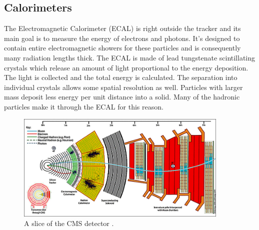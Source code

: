 \FloatBarrier
\subsection{Calorimeters}
The Electromagnetic Calorimeter (ECAL) is right outside the tracker and its main goal is to measure the energy of electrons and photons. It's designed to contain entire electromagnetic showers for these particles and is consequently many radiation lengths thick. The ECAL is made of lead tungstenate scintillating crystals which release an amount of light proportional to the energy deposition. The light is collected and the total energy is calculated. The separation into individual crystals allows some spatial resolution as well. Particles with larger mass deposit less energy per unit distance into a solid. Many of the hadronic particles make it through the ECAL for this reason.

\begin{figure}[h!]
  \centering
  \includegraphics[width=4in]{images/cms_slice.jpg}
  \caption[A slice of the CMS detector.]
   {A slice of the CMS detector \cite{cmsweb}.}
  \label{fig:cmsdetslice}
\end{figure}

